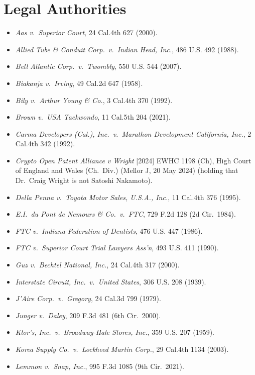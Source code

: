 \documentclass[11pt, twoside, openright]{book}
\begin{document}
\section*{Legal Authorities}
\begin{itemize}[leftmargin=1.5em, itemsep=4pt]
  \item \textit{Aas v.~Superior Court}, 24 Cal.4th 627 (2000).
  \item \textit{Allied Tube \& Conduit Corp.~v.~Indian Head, Inc.}, 486 U.S. 492 (1988).
  \item \textit{Bell Atlantic Corp.~v.~Twombly}, 550 U.S. 544 (2007).
  \item \textit{Biakanja v.~Irving}, 49 Cal.2d 647 (1958).
  \item \textit{Bily v.~Arthur Young \& Co.}, 3 Cal.4th 370 (1992).
  \item \textit{Brown v.~USA Taekwondo}, 11 Cal.5th 204 (2021).
  \item \textit{Carma Developers (Cal.), Inc.~v.~Marathon Development California, Inc.}, 2 Cal.4th 342 (1992).
  \item \textit{Crypto Open Patent Alliance v Wright} [2024] EWHC 1198 (Ch), High Court of England and Wales (Ch.~Div.) (Mellor J, 20 May 2024) (holding that Dr.~Craig Wright is not Satoshi Nakamoto).
  \item \textit{Della Penna v.~Toyota Motor Sales, U.S.A., Inc.}, 11 Cal.4th 376 (1995).
  \item \textit{E.I.~du Pont de Nemours \& Co.~v.~FTC}, 729 F.2d 128 (2d Cir.~1984).
  \item \textit{FTC v.~Indiana Federation of Dentists}, 476 U.S. 447 (1986).
  \item \textit{FTC v.~Superior Court Trial Lawyers Ass'n}, 493 U.S. 411 (1990).
  \item \textit{Guz v.~Bechtel National, Inc.}, 24 Cal.4th 317 (2000).
  \item \textit{Interstate Circuit, Inc.~v.~United States}, 306 U.S. 208 (1939).
  \item \textit{J'Aire Corp.~v.~Gregory}, 24 Cal.3d 799 (1979).
  \item \textit{Junger v.~Daley}, 209 F.3d 481 (6th Cir.~2000).
  \item \textit{Klor's, Inc.~v.~Broadway-Hale Stores, Inc.}, 359 U.S. 207 (1959).
  \item \textit{Korea Supply Co.~v.~Lockheed Martin Corp.}, 29 Cal.4th 1134 (2003).
  \item \textit{Lemmon v.~Snap, Inc.}, 995 F.3d 1085 (9th Cir.~2021).

\end{itemize}
\end{document}
